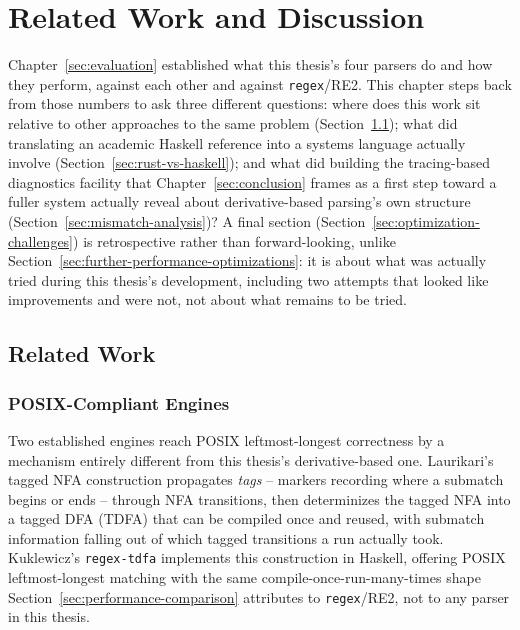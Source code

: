 \chapter{Related Work and Discussion}
\label{sec:discussion}

Chapter~\ref{sec:evaluation} established what this thesis's four parsers
do and how they perform, against each other and against
\texttt{regex}/RE2. This chapter steps back from those numbers to ask
three different questions: where does this work sit relative to other
approaches to the same problem (Section~\ref{sec:related-work}); what did
translating an academic Haskell reference into a systems language
actually involve (Section~\ref{sec:rust-vs-haskell}); and what did
building the tracing-based diagnostics facility that Chapter~\ref{sec:conclusion}
frames as a first step toward a fuller system actually reveal about
derivative-based parsing's own structure (Section~\ref{sec:mismatch-analysis})?
A final section (Section~\ref{sec:optimization-challenges}) is
retrospective rather than forward-looking, unlike
Section~\ref{sec:further-performance-optimizations}: it is about what was
actually tried during this thesis's development, including two attempts
that looked like improvements and were not, not about what remains to be
tried.



\section{Related Work}
\label{sec:related-work}

\subsection{POSIX-Compliant Engines}
\label{sec:posix-engines-related-work}

Two established engines reach POSIX leftmost-longest correctness by a
mechanism entirely different from this thesis's derivative-based one.
Laurikari's tagged NFA construction \citep{laurikari2000} propagates
\emph{tags} -- markers recording where a submatch begins or ends -- through
NFA transitions, then determinizes the tagged NFA into a tagged DFA
(TDFA) that can be compiled once and reused, with submatch information
falling out of which tagged transitions a run actually took. Kuklewicz's
\texttt{regex-tdfa} \citep{kuklewicz_tdfa} implements this construction in
Haskell, offering POSIX leftmost-longest matching with the same
compile-once-run-many-times shape Section~\ref{sec:performance-comparison}
attributes to \texttt{regex}/RE2, not to any parser in this thesis.

